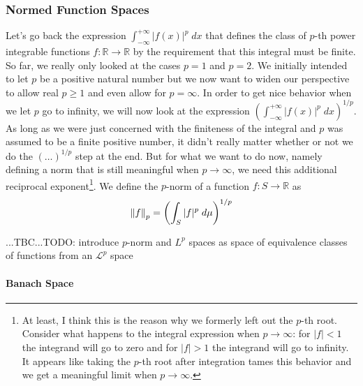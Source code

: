 \subsubsection{Normed Function Spaces}
Let's go back the expression $\int_{-\infty}^{+\infty} |f(x)|^p \; dx$ that defines the class of $p$-th power integrable functions $f: \mathbb{R} \rightarrow \mathbb{R}$ by the requirement that this integral must be finite. So far, we really only looked at the cases $p=1$ and $p=2$. We initially intended to let $p$ be a positive natural number but we now want to widen our perspective to allow real $p \geq 1$ and even allow for $p = \infty$. In order to get nice behavior when we let $p$ go to infinity, we will now look at the expression $(\int_{-\infty}^{+\infty} |f(x)|^p \; dx)^{1/p}$. As long as we were just concerned with the finiteness of the integral and $p$ was assumed to be a finite positive number, it didn't really matter whether or not we do the $(\ldots)^{1/p}$ step at the end. But for what we want to do now, namely defining a norm that is still meaningful when $p \rightarrow \infty$, we need this additional reciprocal exponent\footnote{At least, I think this is the reason why we formerly left out the $p$-th root. Consider what happens to the integral expression when $p \rightarrow \infty$: for $|f| < 1$ the integrand will go to zero and for $|f| > 1$ the integrand will go to infinity. It appears like taking the $p$-th root after integration tames this behavior and we get a meaningful limit when $p \rightarrow \infty$.}. We define the $p$-norm of a function $f: S \rightarrow \mathbb{R}$ as
\begin{equation}
 \left\lVert f\right\rVert_p = \left( \int_S |f|^p \; d\mu \right)^{1/p}
\end{equation}


 ...TBC...TODO: introduce $p$-norm and $L^p$ spaces as space of equivalence classes of functions from an $\mathcal{L}^p$ space



\paragraph{Banach Space}



